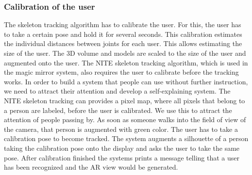 {\subsubsection{Calibration of the user}
The skeleton tracking algorithm has to calibrate the user. For this, the user has to take a certain pose and hold it for several seconds. This calibration estimates the individual distances between joints for each user. This allows estimating the size of the user. The 3D volume and models are scaled to the size of the user and augmented onto the user.  
The NITE skeleton tracking algorithm, which is used in the magic mirror system, also requires the user to calibrate before the tracking works. In order to build a system that people can use without further instruction, we need to attract their attention and develop a self-explaining system. The NITE skeleton tracking can provides a pixel map, where all pixels that belong to a person are labeled, before the user is calibrated. We use this to attract the attention of people passing by. As soon as someone walks into the field of view of the camera, that person is augmented with green color. The user has to take a calibration pose to become tracked. The system augments a silhouette of a person taking the calibration pose onto the display and asks the user to take the same pose. After calibration finished the systems prints a message telling that a user has been recognized and the AR view would be generated.

}
